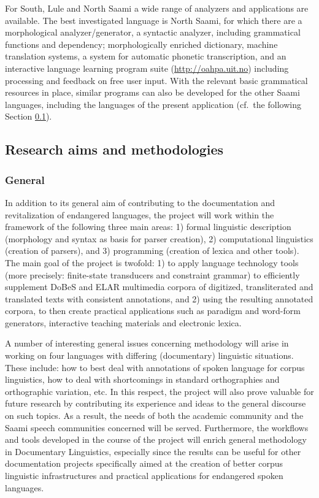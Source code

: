 \documentclass[a4paper,12pt]{article}
\begin{document}
For South, Lule and North Saami a wide range of analyzers and applications are available. The best investigated language is North Saami, for which there are a morphological analyzer/generator, a syntactic analyzer, including grammatical functions and dependency; morphologically enriched dictionary, machine translation systems, a system for automatic phonetic transcription, and an interactive language learning program suite (\url{http://oahpa.uit.no}) including processing and feedback on free user input. With the relevant basic grammatical resources in place, similar programs can also be developed for the other Saami languages, including the languages of the present application (cf.~the following Section \ref{method}).

\subsection{Research aims and methodologies}\label{method}
\subsubsection{General}

In addition to its general aim of contributing to the documentation and revitalization of endangered languages, the project will work within the framework of the following three main areas: 1) formal linguistic description (morphology and syntax as basis for parser creation), 2) computational linguistics (creation of parsers), and 3) programming (creation of lexica and other tools). The main goal of the project is twofold: 1) to apply language technology tools (more precisely: finite-state transducers and constraint grammar) to efficiently supplement DoBeS and ELAR multimedia corpora of digitized, transliterated and translated texts with consistent annotations, and 2) using the resulting annotated corpora, to then create practical applications such as paradigm and word-form generators, interactive teaching materials and electronic lexica. 

A number of interesting general issues concerning methodology will arise in working on four languages with differing (documentary) linguistic situations. These include: how to best deal with annotations of spoken language for corpus linguistics, how to deal with shortcomings in standard orthographies and orthographic variation, etc. In this respect, the project will also prove valuable for future research by contributing its experience and ideas to the general discourse on such topics. As a result, the needs of both the academic community and the Saami speech communities concerned will be served. Furthermore, the workflows and tools developed in the course of the project will enrich general methodology in Documentary Linguistics, especially since the results can be useful for other documentation projects specifically aimed at the creation of better corpus linguistic infrastructures and practical applications for endangered spoken languages.
\end{document}
